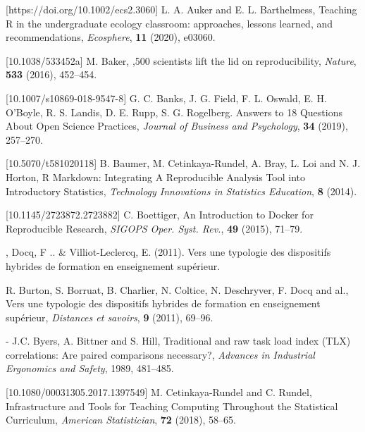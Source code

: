 \documentclass{aims}
\theoremstyle{definition}
\begin{document}
\begin{thebibliography}{99}
 [https://doi.org/10.1002/ecs2.3060]
     \newblock  L. A. Auker and E. L. Barthelmess,
     \newblock Teaching R in the undergraduate ecology classroom: approaches, lessons learned, and recommendations,
     \newblock \emph{Ecosphere}, \textbf{11} (2020), e03060.

 [10.1038/533452a]
     \newblock  M. Baker,
     ,500 scientists lift the lid on reproducibility,
     \newblock \emph{Nature}, \textbf{533} (2016), 452--454.

 [10.1007/s10869-018-9547-8]
     \newblock  G. C. Banks, J. G. Field, F. L. Oswald, E. H. O'Boyle, R. S. Landis, D. E. Rupp, S. G. Rogelberg.
     \newblock Answers to 18 Questions About Open Science Practices,
     \newblock \emph{Journal of Business and Psychology}, \textbf{34} (2019), 257--270.

 [10.5070/t581020118]
     \newblock B. Baumer, M. Cetinkaya-Rundel, A. Bray, L. Loi and N. J. Horton,
     \newblock R Markdown: Integrating A Reproducible Analysis Tool into Introductory Statistics,
     \newblock \emph{Technology Innovations in Statistics Education}, \textbf{8} (2014).

 [10.1145/2723872.2723882]
     \newblock  C. Boettiger,
     \newblock An Introduction to Docker for Reproducible Research,
     \newblock \emph{SIGOPS Oper. Syst. Rev.}, \textbf{49} (2015), 71--79.

, Docq, F .. & Villiot-Leclercq, E. (2011). Vers une typologie des dispositifs hybrides de formation en enseignement supérieur.

     \newblock  R. Burton, S. Borruat, B. Charlier, N. Coltice, N. Deschryver, F. Docq and al.,
     \newblock Vers une typologie des dispositifs hybrides de formation en enseignement supérieur,
     \newblock \emph{Distances et savoirs}, \textbf{9} (2011), 69--96.

 -
     \newblock  J.C. Byers, A. Bittner and S. Hill,
     \newblock Traditional and raw task load index (TLX) correlations: Are paired comparisons necessary?,
     \newblock \emph{Advances in Industrial Ergonomics and Safety}, 1989, 481--485.

 [10.1080/00031305.2017.1397549]
     \newblock  M. Cetinkaya-Rundel and C. Rundel,
     \newblock Infrastructure and Tools for Teaching Computing Throughout the Statistical Curriculum,
     \newblock \emph{American Statistician}, \textbf{72} (2018), 58--65.


\end{thebibliography}
\end{document}
